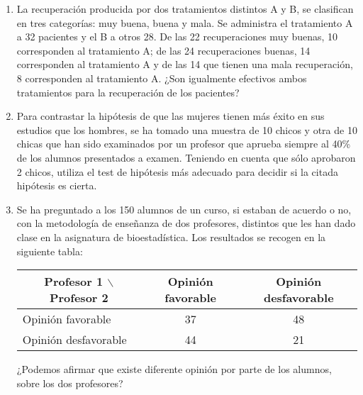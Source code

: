 \begin{enumerate}
\item La recuperación producida por dos tratamientos distintos A y B, se clasifican en tres categorías: muy buena, buena y mala. Se
administra el tratamiento A a 32 pacientes y el B a otros 28. De las 22 recuperaciones muy buenas, 10 corresponden al tratamiento A; de las
24 recuperaciones buenas, 14 corresponden al tratamiento A y de las 14 que tienen una mala recuperación, 8 corresponden al tratamiento A.
¿Son igualmente efectivos ambos tratamientos para la recuperación de los pacientes?

\item Para contrastar la hipótesis de que las mujeres tienen más éxito en sus estudios que los hombres, se ha tomado una muestra de 10
chicos y otra de 10 chicas que han sido examinados por un profesor que aprueba siempre al 40\% de los alumnos presentados a examen. Teniendo
en cuenta que sólo aprobaron 2 chicos, utiliza el test de hipótesis más adecuado para decidir si la citada hipótesis es cierta.

\item Se ha preguntado a los 150 alumnos de un curso, si estaban de acuerdo o no, con la metodología de enseñanza de dos profesores,
distintos que les han dado clase en la asignatura de bioestadística. Los resultados se recogen en la siguiente tabla:
\begin{center}
\begin{tabular}{|l|c|c|}
\cline{2-3}
\multicolumn{1}{c|}{Profesor 1 $\backslash$ Profesor 2} & Opinión favorable & Opinión desfavorable  \\
\hline
Opinión favorable & 37 & 48  \\
\hline
Opinión desfavorable & 44 & 21 \\
\hline
\end{tabular}
\end{center}

¿Podemos afirmar que existe diferente opinión por parte de los alumnos, sobre los dos profesores?

\end{enumerate}

